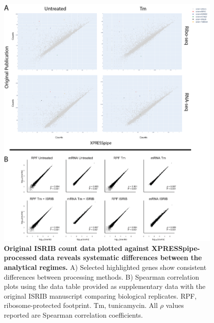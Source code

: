 \documentclass[10pt, oneside]{article}
\begin{document}
\begin{figure}
\centering
  \includegraphics[width=160mm]{figures/xpresspipe_supplement2.png}
  \caption{\textbf{Original ISRIB count data plotted against XPRESSpipe-processed data reveals systematic differences between the analytical regimes.} A) Selected highlighted genes show consistent differences between processing methods. B) Spearman correlation plots using the data table provided as supplementary data with the original ISRIB manuscript comparing biological replicates. RPF, ribosome-protected footprint. Tm, tunicamycin. All $\rho$ values reported are Spearman correlation coefficients.}
  \label{fig:supplement2}
\end{figure}
\end{document}

